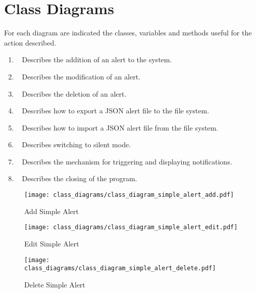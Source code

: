 \chapter{Class Diagrams}\label{ch:class_diagrams}
For each diagram are indicated the classes, variables and methods useful for the
action described.

\begin{enumerate}
    \item~ Describes the addition of an alert
        to the system.

    \item~ Describes the modification of an
        alert.

    \item~ Describes the deletion of an
       alert.

    \item~ Describes how to export a JSON alert
       file to the file system.

    \item~ Describes how to import a JSON alert
       file from the file system.

    \item~ Describes switching to silent mode.

    \item~ Describes the mechanism
        for triggering and displaying notifications.

    \item~ Describes the closing of the program.
\end{enumerate}

\begin{figure}[]
	\centering
    \caption{Add Simple Alert}\label{fig:cls_simple_alert_add}
    \texttt{[image: class\_diagrams/class\_diagram\_simple\_alert\_add.pdf]}
\end{figure}

\begin{figure}[]
	\centering
    \caption{Edit Simple Alert}\label{fig:cls_simple_alert_edit}
    \texttt{[image: class\_diagrams/class\_diagram\_simple\_alert\_edit.pdf]}
\end{figure}

\begin{figure}[]
	\centering
    \caption{Delete Simple Alert}\label{fig:cls_simple_alert_delete}
    \texttt{[image: class\_diagrams/class\_diagram\_simple\_alert\_delete.pdf]}
\end{figure}


